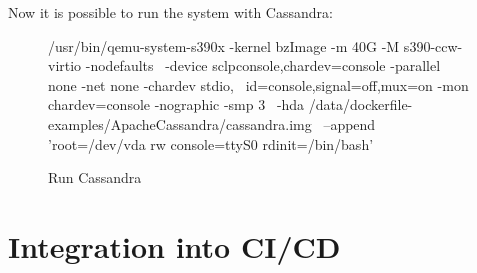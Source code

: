 Now it is possible to run the system with Cassandra: \\
\begin{figure}[H]
\centering
\begin{boxedverbatim}
 /usr/bin/qemu-system-s390x -kernel bzImage -m 40G -M s390-ccw-virtio -nodefaults \
 -device sclpconsole,chardev=console -parallel none -net none -chardev stdio, \
 id=console,signal=off,mux=on -mon chardev=console -nographic -smp 3 \
 -hda /data/dockerfile-examples/ApacheCassandra/cassandra.img \
 --append 'root=/dev/vda rw console=ttyS0 rdinit=/bin/bash' 
\end{boxedverbatim}
 \caption{Run Cassandra}
    \label{RunCassandra}
\end{figure}

\section{Integration into CI/CD}

